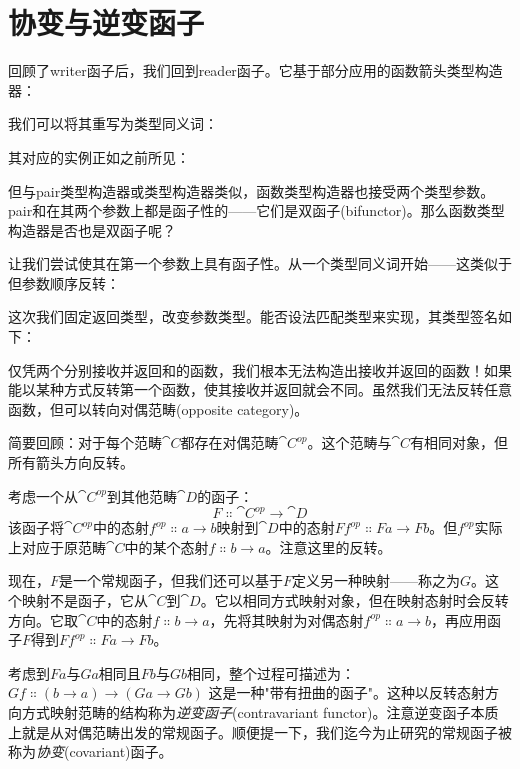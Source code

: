 \section{协变与逆变函子}

回顾了writer函子后，我们回到reader函子。它基于部分应用的函数箭头类型构造器：

我们可以将其重写为类型同义词：

其对应的实例正如之前所见：

但与pair类型构造器或类型构造器类似，函数类型构造器也接受两个类型参数。pair和在其两个参数上都是函子性的——它们是双函子(bifunctor)。那么函数类型构造器是否也是双函子呢？

让我们尝试使其在第一个参数上具有函子性。从一个类型同义词开始——这类似于但参数顺序反转：

这次我们固定返回类型，改变参数类型。能否设法匹配类型来实现，其类型签名如下：

仅凭两个分别接收并返回和的函数，我们根本无法构造出接收并返回的函数！如果能以某种方式反转第一个函数，使其接收并返回就会不同。虽然我们无法反转任意函数，但可以转向对偶范畴(opposite category)。

简要回顾：对于每个范畴$\cat{C}$都存在对偶范畴$\cat{C}^\mathit{op}$。这个范畴与$\cat{C}$有相同对象，但所有箭头方向反转。

考虑一个从$\cat{C}^\mathit{op}$到其他范畴$\cat{D}$的函子：
$$F \Colon \cat{C}^\mathit{op} \to \cat{D}$$
该函子将$\cat{C}^\mathit{op}$中的态射$f^\mathit{op} \Colon a \to b$映射到$\cat{D}$中的态射$F f^\mathit{op} \Colon F a \to F b$。但$f^\mathit{op}$实际上对应于原范畴$\cat{C}$中的某个态射$f \Colon b \to a$。注意这里的反转。

现在，$F$是一个常规函子，但我们还可以基于$F$定义另一种映射——称之为$G$。这个映射不是函子，它从$\cat{C}$到$\cat{D}$。它以相同方式映射对象，但在映射态射时会反转方向。它取$\cat{C}$中的态射$f \Colon b \to a$，先将其映射为对偶态射$f^\mathit{op} \Colon a \to b$，再应用函子$F$得到$F f^\mathit{op} \Colon F a \to F b$。

考虑到$F a$与$G a$相同且$F b$与$G b$相同，整个过程可描述为：$G f \Colon (b \to a) \to (G a \to G b)$
这是一种"带有扭曲的函子"。这种以反转态射方向方式映射范畴的结构称为\emph{逆变函子}(contravariant functor)。注意逆变函子本质上就是从对偶范畴出发的常规函子。顺便提一下，我们迄今为止研究的常规函子被称为\emph{协变}(covariant)函子。

